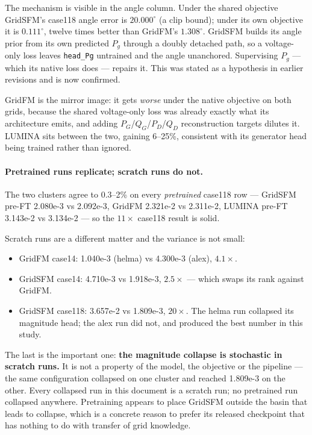 \documentclass[10pt]{article}
\begin{document}
The mechanism is visible in the angle column. Under the shared objective
GridSFM's case118 angle error is \(20.000^\circ\) (a clip bound); under its own
objective it is \(0.111^\circ\), twelve times better than GridFM's
\(1.308^\circ\). GridSFM builds its angle prior from its own predicted \(P_g\)
through a doubly detached path, so a voltage-only loss leaves \texttt{head\_Pg}
untrained and the angle unanchored. Supervising \(P_g\) --- which its native
loss does --- repairs it. This was stated as a hypothesis in earlier revisions
and is now confirmed.

GridFM is the mirror image: it gets \emph{worse} under the native objective on
both grids, because the shared voltage-only loss was already exactly what its
architecture emits, and adding \(P_G\)/\(Q_G\)/\(P_D\)/\(Q_D\) reconstruction
targets dilutes it. LUMINA sits between the two, gaining 6--25\%, consistent
with its generator head being trained rather than ignored.

\paragraph{Pretrained runs replicate; scratch runs do not.} The two clusters
agree to 0.3--2\% on every \emph{pretrained} case118 row --- GridSFM pre-FT
2.080e-3 vs 2.092e-3, GridFM 2.321e-2 vs 2.311e-2, LUMINA pre-FT 3.143e-2 vs
3.134e-2 --- so the \(11\times\) case118 result is solid.

Scratch runs are a different matter and the variance is not small:

\begin{itemize}\itemsep2pt
\item GridFM case14: 1.040e-3 (helma) vs 4.300e-3 (alex), \(4.1\times\).
\item GridSFM case14: 4.710e-3 vs 1.918e-3, \(2.5\times\) --- which swaps its
rank against GridFM.
\item GridSFM case118: 3.657e-2 vs 1.809e-3, \(20\times\). The helma run
collapsed its magnitude head; the alex run did not, and produced the best number
in this study.
\end{itemize}

The last is the important one: \textbf{the magnitude collapse is stochastic in
scratch runs.} It is not a property of the model, the objective or the pipeline
--- the same configuration collapsed on one cluster and reached 1.809e-3 on the
other. Every collapsed run in this document is a scratch run; no pretrained run
collapsed anywhere. Pretraining appears to place GridSFM outside the basin that
leads to collapse, which is a concrete reason to prefer its released checkpoint
that has nothing to do with transfer of grid knowledge.
\end{document}
